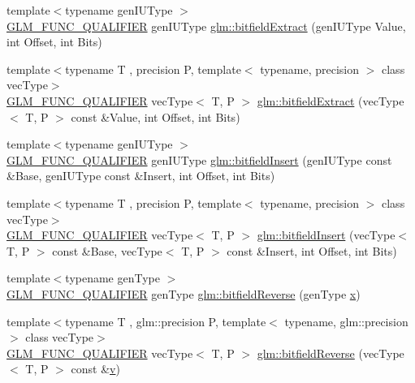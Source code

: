\begin{DoxyCompactItemize}
\item 
{\footnotesize template$<$typename gen\+I\+U\+Type $>$ }\\\mbox{\hyperlink{setup_8hpp_a33fdea6f91c5f834105f7415e2a64407}{G\+L\+M\+\_\+\+F\+U\+N\+C\+\_\+\+Q\+U\+A\+L\+I\+F\+I\+ER}} gen\+I\+U\+Type \mbox{\hyperlink{namespaceglm_ab781f965cc1130fc70a0a8aaf50e6813}{glm\+::bitfield\+Extract}} (gen\+I\+U\+Type Value, int Offset, int Bits)
\item 
{\footnotesize template$<$typename T , precision P, template$<$ typename, precision $>$ class vec\+Type$>$ }\\\mbox{\hyperlink{setup_8hpp_a33fdea6f91c5f834105f7415e2a64407}{G\+L\+M\+\_\+\+F\+U\+N\+C\+\_\+\+Q\+U\+A\+L\+I\+F\+I\+ER}} vec\+Type$<$ T, P $>$ \mbox{\hyperlink{group__core__func__integer_gab84b88f3a8e367774e5dd1c618c353cf}{glm\+::bitfield\+Extract}} (vec\+Type$<$ T, P $>$ const \&Value, int Offset, int Bits)
\item 
{\footnotesize template$<$typename gen\+I\+U\+Type $>$ }\\\mbox{\hyperlink{setup_8hpp_a33fdea6f91c5f834105f7415e2a64407}{G\+L\+M\+\_\+\+F\+U\+N\+C\+\_\+\+Q\+U\+A\+L\+I\+F\+I\+ER}} gen\+I\+U\+Type \mbox{\hyperlink{namespaceglm_acec32bd3c6eb5719c5aea5b423085ae6}{glm\+::bitfield\+Insert}} (gen\+I\+U\+Type const \&Base, gen\+I\+U\+Type const \&Insert, int Offset, int Bits)
\item 
{\footnotesize template$<$typename T , precision P, template$<$ typename, precision $>$ class vec\+Type$>$ }\\\mbox{\hyperlink{setup_8hpp_a33fdea6f91c5f834105f7415e2a64407}{G\+L\+M\+\_\+\+F\+U\+N\+C\+\_\+\+Q\+U\+A\+L\+I\+F\+I\+ER}} vec\+Type$<$ T, P $>$ \mbox{\hyperlink{group__core__func__integer_ga5681dfac9239beb1b8bd995e3c6496d7}{glm\+::bitfield\+Insert}} (vec\+Type$<$ T, P $>$ const \&Base, vec\+Type$<$ T, P $>$ const \&Insert, int Offset, int Bits)
\item 
{\footnotesize template$<$typename gen\+Type $>$ }\\\mbox{\hyperlink{setup_8hpp_a33fdea6f91c5f834105f7415e2a64407}{G\+L\+M\+\_\+\+F\+U\+N\+C\+\_\+\+Q\+U\+A\+L\+I\+F\+I\+ER}} gen\+Type \mbox{\hyperlink{namespaceglm_abaf011115ec2807a589806911d97c10e}{glm\+::bitfield\+Reverse}} (gen\+Type \mbox{\hyperlink{glad_8h_a92d0386e5c19fb81ea88c9f99644ab1d}{x}})
\item 
{\footnotesize template$<$typename T , glm\+::precision P, template$<$ typename, glm\+::precision $>$ class vec\+Type$>$ }\\\mbox{\hyperlink{setup_8hpp_a33fdea6f91c5f834105f7415e2a64407}{G\+L\+M\+\_\+\+F\+U\+N\+C\+\_\+\+Q\+U\+A\+L\+I\+F\+I\+ER}} vec\+Type$<$ T, P $>$ \mbox{\hyperlink{group__core__func__integer_ga153e7e8d0c035f83cce50fc3e580930f}{glm\+::bitfield\+Reverse}} (vec\+Type$<$ T, P $>$ const \&\mbox{\hyperlink{glad_8h_a14cfbe2fc2234f5504618905b69d1e06}{v}})

\end{DoxyCompactItemize}
